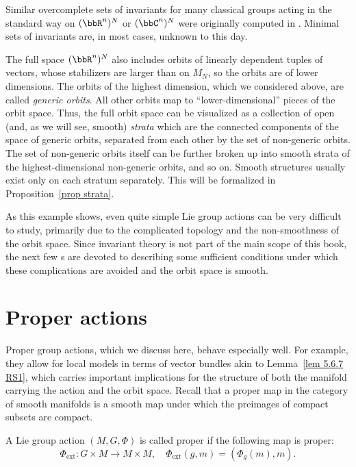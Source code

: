 \begin{example}
    Similar overcomplete sets of invariants for many classical groups acting in the standard way on $(\bbR^n)^N$ or $(\bbC^n)^N$ were originally computed in \cite{Weyl}. Minimal sets of invariants are, in most cases, unknown to this day.

    The full space $(\bbR^n)^N$ also includes orbits of linearly dependent tuples of vectors, whose stabilizers are larger than on $M_N$, so the orbits are of lower dimensions. The orbits of the highest dimension, which we considered above, are called \emph{generic orbits}. All other orbits map to ``lower-dimensional'' pieces of the orbit space. Thus, the full orbit space can be visualized as a collection of open (and, as we will see, smooth) \emph{strata} which are the connected components of the space of generic orbits, separated from each other by the set of non-generic orbits. The set of non-generic orbits itself can be further broken up into smooth strata of the highest-dimensional non-generic orbits, and so on. Smooth structures usually exist only on each stratum separately. This will be formalized in Proposition~\ref{prop strata}.
\end{example}

As this example shows, even quite simple Lie group actions can be very difficult to study, primarily due to the complicated topology and the non-smoothness of the orbit space. Since invariant theory is not part of the main scope of this book, the next few \sect s are devoted to describing some sufficient conditions under which these complications are avoided and the orbit space is smooth.






\section{Proper actions}


Proper group actions, which we discuss here, behave especially well. For example, they allow for local models in terms of vector bundles akin to Lemma~\ref{lem 5.6.7 RS1}, which carries important implications for the structure of both the manifold carrying the action and the orbit space. Recall that a proper map in the category of smooth manifolds is a smooth map under which the preimages of compact subsets are compact.

\begin{defn}
    A Lie group action $(M,G,\Phi)$ is called proper if the following map is proper:
    \[\Phi_{\mathrm{ext}}:G\times M\to M\times M,\quad \Phi_{\mathrm{ext}}(g,m)=\left(\Phi_g(m),m\right).\]
\end{defn}

